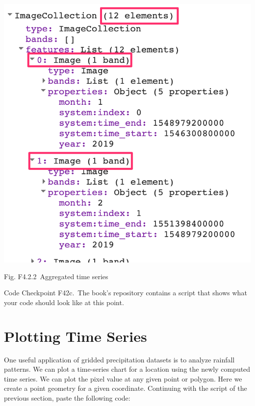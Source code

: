 \documentclass[
  letterpaper,
  DIV=11,
  numbers=noendperiod]{scrreprt}
\begin{document}
\includegraphics{./F4/image90.png}

Fig. F4.2.2~Aggregated time series

\begin{tcolorbox}[enhanced jigsaw, left=2mm, breakable, rightrule=.15mm, opacityback=0, colframe=quarto-callout-note-color-frame, colbacktitle=quarto-callout-note-color!10!white, arc=.35mm, opacitybacktitle=0.6, toptitle=1mm, colback=white, leftrule=.75mm, title=\textcolor{quarto-callout-note-color}{\faInfo}\hspace{0.5em}{Note}, toprule=.15mm, bottomtitle=1mm, titlerule=0mm, bottomrule=.15mm, coltitle=black]

Code Checkpoint F42c.~The book's repository contains a script that shows
what your code should look like at this point.

\end{tcolorbox}

\hypertarget{plotting-time-series}{%
\section{Plotting Time Series}\label{plotting-time-series}}

One useful application of gridded precipitation datasets is to analyze
rainfall patterns. We can plot a time-series chart for a location using
the newly computed time series. We can plot the pixel value at any given
point or polygon. Here we create a point geometry for a given
coordinate. Continuing with the script of the previous section, paste
the following code:
\end{document}
